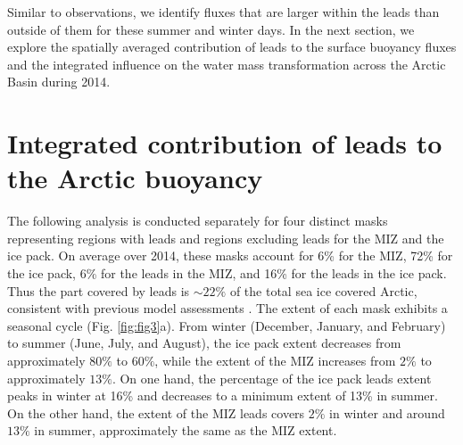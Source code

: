 \documentclass[lineno,sn-basic]{sn-jnl}%
\begin{document}
Similar to observations, we identify fluxes that are larger within the leads than outside of them for these summer and winter days. In the next section, we explore the spatially averaged contribution of leads to the surface buoyancy fluxes and the integrated influence on the water mass transformation across the Arctic Basin during 2014. 

\section{Integrated contribution of leads to the Arctic buoyancy}\label{sec3}

The following analysis is conducted separately for four distinct masks representing regions with leads and regions excluding leads for the MIZ and the ice pack. On average over 2014, these masks account for 6\% for the MIZ, 72\% for the ice pack, 6\% for the leads in the MIZ, and 16\% for the leads in the ice pack. Thus the part covered by leads is $\sim 22\%$ of the total sea ice covered Arctic, consistent with previous model assessments \citep{Wang_leads_2016}. 
The extent of each mask exhibits a seasonal cycle (Fig. \ref{fig:fig3}a). From winter (December, January, and February) to  summer (June, July, and August), the ice pack extent decreases from approximately $80\%$ to $60\%$, while the extent of the MIZ increases from $2\%$ to approximately $13\%$. 
On one hand, the percentage of the ice pack leads extent peaks in winter at 16\% and decreases to a minimum extent of 13\% in summer. On the other hand, the extent of the MIZ leads covers $2\%$ in winter and around $13\%$ in summer, approximately the same as the MIZ extent. 
\end{document}
